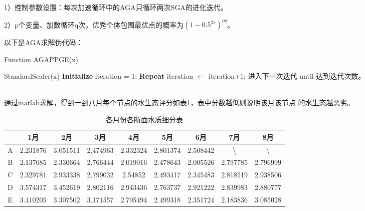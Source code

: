 \documentclass{whutmod}
\begin{document}
\begin{spacing}{1.2}
1）控制参数设置：每次加速循环中的AGA只循环两次SGA的进化迭代。

2）p个变量、加数循环q次，优秀个体包围最优点的概率为$(1-0.5^{2s})^{pq}$。

以下是AGA求解伪代码：

\begin{algorithm}
	\caption{Function AGAPPGE(x)}
	\LinesNumbered
	StandardScaler(x)
	\textbf{Initialize}
	iteration = 1;
	\textbf{Repeat}
	iteration $\leftarrow$ iteration$+1$; {\mbox{进入下一次迭代}} \newline
	until \mbox{达到迭代次数。}
\end{algorithm}
~\\

通过matlab求解，得到一到八月每个节点的水生态评分如表\ref{得分}，表中分数越低则说明该月该节点
的水生态越恶劣。

\begin{table}[htbp]
	\centering
	\caption{各月份各断面水质细分表}
	  \begin{tabular}{ccccccccc}\toprule[1.5pt]
        & 1月  & 2月  & 3月  & 4月  & 5月  & 6月  & 7月  & 8月 \\ \hline
    A   & 2.231876 & 3.051511 & 2.474963 & 2.332324 & 2.801374 & 2.508442 & \textbackslash{} & \textbackslash{} \\
    B   & 2.137685 & 2.330664 & 2.766444 & 2.019016 & 2.478643 & 2.005526 & 2.797785 & 2.796999 \\
    C   & 2.329781 & 2.933338 & 2.799032 & 2.54852 & 2.493417 & 2.345483 & 2.818519 & 2.938506 \\
    D   & 3.574317 & 3.452619 & 2.802116 & 2.943436 & 2.763737 & 2.921222 & 2.839983 & 2.880777 \\
    E   & 3.410205 & 3.307502 & 3.171557 & 2.795494 & 2.499318 & 2.351724 & 2.183836 & 3.085028 \\ \bottomrule[1.5pt]
    \end{tabular}%
	\label{得分}%
  \end{table}%


\end{spacing}
\end{document}

